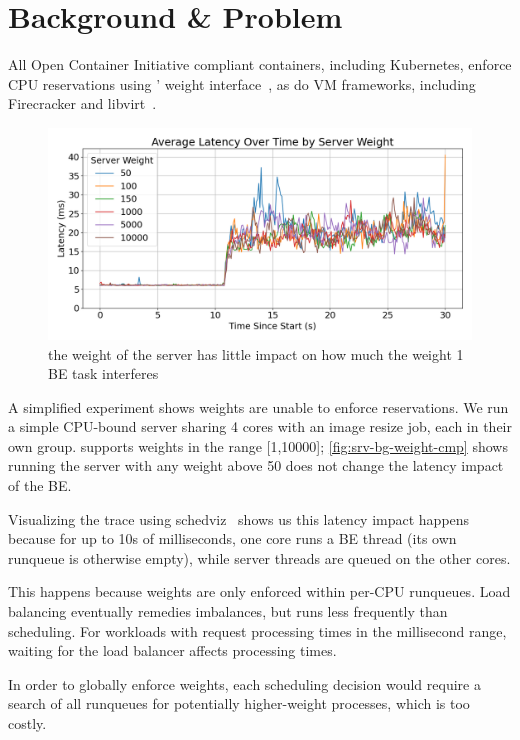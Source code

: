 
\section{Background \& Problem}

All Open Container Initiative compliant containers, including Kubernetes,
enforce CPU reservations using \cgroups{}' weight
interface~\cite{container-isolation-article}, as do VM frameworks, including
Firecracker and libvirt~\cite{firecracker-cgroups,libvirt-cgroups}. 

\begin{figure}[t]
    \centering
    \includegraphics[width=0.9\columnwidth]{graphs/srv-bg-weight-cmp-low.png}
    \caption{ the weight of the server has little impact on how much the
    weight 1 BE task interferes }\label{fig:srv-bg-weight-cmp}
\end{figure}


A simplified experiment shows \cgroups{} weights are unable to enforce
reservations. We run a simple CPU-bound server sharing 4 cores with an image
resize job, each in their own group. \cgroups{} supports weights in the range
[1,10000]; \autoref{fig:srv-bg-weight-cmp} shows running the server with any
weight above 50 does not change the latency impact of the BE.

Visualizing the trace using schedviz~\cite{schedviz-tool} shows us this latency
impact happens because for up to 10s of milliseconds, one core runs a BE thread
(its own runqueue is otherwise empty), while server threads are queued on the
other cores.

This happens because weights are only enforced within per-CPU runqueues. Load
balancing eventually remedies imbalances, but runs less frequently than
scheduling. For workloads with request processing times in the millisecond
range, waiting for the load balancer affects processing times.

In order to globally enforce weights, each scheduling decision would require a
search of all runqueues for potentially higher-weight processes, which is too
costly. 




